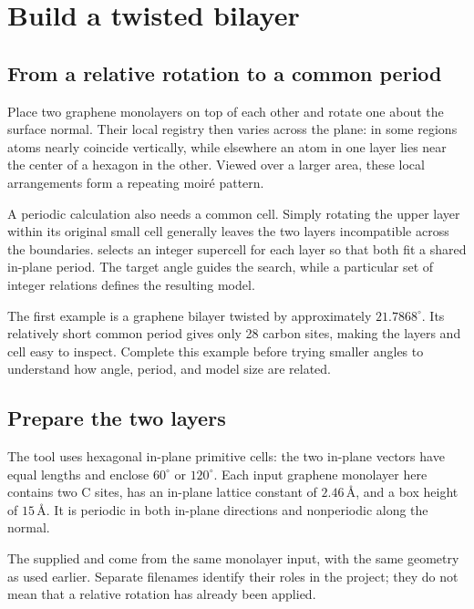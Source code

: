 \section{Build a twisted bilayer}\label{sec:twisted-structures}

\subsection{From a relative rotation to a common period}

Place two graphene monolayers on top of each other and rotate one about the surface normal. Their local registry then varies across the plane: in some regions atoms nearly coincide vertically, while elsewhere an atom in one layer lies near the center of a hexagon in the other. Viewed over a larger area, these local arrangements form a repeating moiré pattern.

A periodic calculation also needs a common cell. Simply rotating the upper layer within its original small cell generally leaves the two layers incompatible across the boundaries.  selects an integer supercell for each layer so that both fit a shared in-plane period. The target angle guides the search, while a particular set of integer relations defines the resulting model.

The first example is a graphene bilayer twisted by approximately $21.7868^\circ$. Its relatively short common period gives only 28 carbon sites, making the layers and cell easy to inspect. Complete this example before trying smaller angles to understand how angle, period, and model size are related.

\subsection{Prepare the two layers}

The tool uses hexagonal in-plane primitive cells: the two in-plane vectors have equal lengths and enclose $60^\circ$ or $120^\circ$. Each input graphene monolayer here contains two C sites, has an in-plane lattice constant of $2.46\,\text{\AA}$, and a box height of $15\,\text{\AA}$. It is periodic in both in-plane directions and nonperiodic along the normal.

The supplied  and  come from the same monolayer input, with the same geometry as  used earlier. Separate filenames identify their roles in the project; they do not mean that a relative rotation has already been applied.

